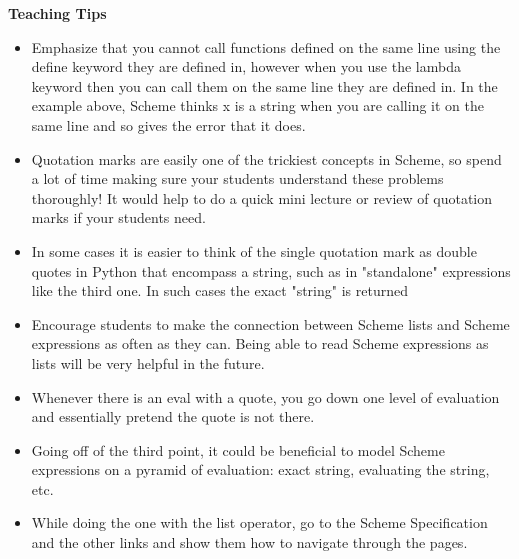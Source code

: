 \begin{blocksection}
\begin{guide}
\textbf{Teaching Tips}
\begin{itemize}
	\item Emphasize that you cannot call functions defined on the same line using the define keyword they are defined in, however when you use the lambda keyword then you can call them on the same line they are defined in. In the example above, Scheme thinks x is a string when you are calling it on the same line and so gives the error that it does.
	\item Quotation marks are easily one of the trickiest concepts in Scheme, so spend a lot of time making sure your students understand these problems thoroughly! It would help to do a quick mini lecture or review of quotation marks if your students need.		\item In some cases it is easier to think of the single quotation mark as double quotes in Python that encompass a string, such as in "standalone" expressions like the third one. In such cases the exact "string" is returned
	\item Encourage students to make the connection between Scheme lists and Scheme expressions as often as they can. Being able to read Scheme expressions as lists will be very helpful in the future.
	\item Whenever there is an eval with a quote, you go down one level of evaluation and essentially pretend the quote is not there.
	\item Going off of the third point, it could be beneficial to model Scheme expressions on a pyramid of evaluation: exact string, evaluating the string, etc.
	\item While doing the one with the list operator, go to the Scheme Specification and the other links and show them how to navigate through the pages. 
\end{itemize}
\end{guide}
\end{blocksection}